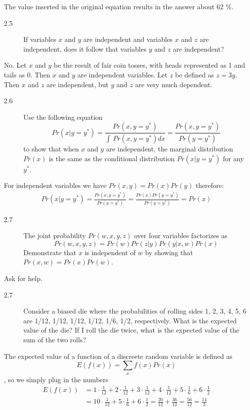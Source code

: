 \documentclass[10pt,a4paper]{article}
\newenvironment{prob}[1]%
   {%
    \begin{description}\item[#1]}%
   {\end{description}}
\begin{document}
The value inserted in the original equation results in the answer about 62 \%.
\begin{prob}{2.5}
  If variables $x$ and $y$ are independent and variables $x$ and $z$ are
  independent, does it follow that variables $y$ and $z$ are independent?
\end{prob}
No. Let $x$ and $y$ be the result of fair coin tosses, with heads
represented as 1 and tails as 0. Then $x$ and $y$ are independent
variables. Let $z$ be defined as $z = 3y$. Then $x$ and $z$ are
independent, but $y$ and $z$ are very much dependent.

\begin{prob}{2.6}
  Use the following equation
  \begin{equation}
    Pr(x|y = y^*) = \frac{Pr(x,y=y^*)}{\int\,Pr(x,y=y^*)dx}
    = \frac{Pr(x, y=y^*)}{Pr(y=y^*)}
  \end{equation}
  to show that when $x$ and $y$ are independent, the
  marginal distribution $Pr(x)$ is the same as the conditional
  distribution $Pr(x|y = y^*)$ for any $y^*$.
\end{prob}
For independent variables we have $Pr(x,y) = Pr(x)Pr(y)$ therefore:
\begin{align}
  Pr(x|y = y^*) = \frac{Pr(x, y=y^*)}{Pr(y=y^*)} = \frac{Pr(x)Pr(y=y^*)}{Pr(y=y^*)} = Pr(x)
\end{align}
\begin{prob}{2.7}
  The joint probability $Pr(w, x, y, z)$ over four variables factorizes as
  \begin{equation}
    Pr(w, x, y, z) = Pr(w)Pr(z|y)Pr(y|x, w)Pr(x)
  \end{equation}
  Demonstrate that $x$ is independent of $w$ by showing that $Pr(x, w)
  = Pr(x)Pr(w)$.
\end{prob}
Ask for help.
\begin{prob}{2.7}
  Consider a biased die where the probabilities of rolling sides {1,
    2, 3, 4, 5, 6} are {1/12, 1/12, 1/12, 1/12, 1/6, 1/2},
  respectively. What is the expected value of the die?  If I roll the
  die twice, what is the expected value of the sum of the two rolls?
\end{prob}
The expected value of a function of a discreete random variable is defined as
\begin{equation}
  E(f(x)) = \sum_xf(x)Pr(x)
\end{equation}
, so we simply plug in the numbers
\begin{align}
  E(f(x)) &= 1\cdot\tfrac{1}{12} + 2\cdot\tfrac{1}{12} + 3\cdot\tfrac{1}{12} + 4\cdot\tfrac{1}{12} + 5\cdot\tfrac{1}{6} + 6\cdot\tfrac{1}{2}\\
  &= 10\cdot\tfrac{1}{12} + 5\cdot\tfrac{1}{6} + 6\cdot\tfrac{1}{2} = \tfrac{20}{12} + \tfrac{36}{12} = \tfrac{56}{12} = \tfrac{14}{3}
\end{align}
\end{document}
